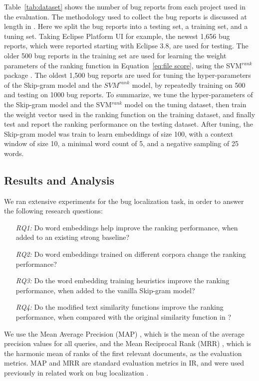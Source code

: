 Table~\ref{tab:dataset} shows the number of bug reports from each project used in the evaluation. The methodology used to collect the bug reports is discussed at length in \cite{ye:fse14}. Here we split the bug reports into a testing set, a training set, and a tuning set. Taking Eclipse Platform UI for example, the newest 1,656 bug reports, which were reported starting with Eclipse 3.8, are used for testing. The older 500 bug reports in the training set are used for learning the weight parameters of the ranking function in Equation~\ref{eq:file score}, using the SVM$^{rank}$ package \cite{Joachims:2002:OSE:775047.775067, Joachims:2006:TLS:1150402.1150429}. The oldest 1,500 bug reports are used for tuning the hyper-parameters of the Skip-gram model and the $SVM^{rank}$ model, by repeatedly training on 500 and testing on 1000 bug reports. To summarize, we tune the hyper-parameters of the Skip-gram model and the SVM$^{rank}$ model on the tuning dataset, then train the weight vector used in the ranking function on the training dataset, and finally test and report the ranking performance on the testing dataset. After tuning, the Skip-gram model was train to learn embeddings of size 100, with a context window of size 10, a minimal word count of 5, and a negative sampling of 25 words. 


\subsection{Results and Analysis}
\label{sec:evaluation:results and analysis}

We ran extensive experiments for the bug localization task, in order to answer the following research questions:
\begin{enumerate}
  \item[\textit{RQ1:}] Do word embeddings help improve the ranking performance, when added to an existing strong baseline?
  \item[\textit{RQ2:}] Do word embeddings trained on different corpora change the ranking performance?
  \item[\textit{RQ3:}] Do the word embedding training heuristics improve the ranking performance, when added to the vanilla Skip-gram model?
  \item[\textit{RQ4:}] Do the modified text similarity functions improve the ranking performance, when compared with the original similarity function in \cite{mihalcea:aaai06}?
\end{enumerate}

We use the Mean Average Precision (MAP) \cite{Manning:2008:IIR:1394399}, which is the mean of the average precision values for all queries, and the Mean Reciprocal Rank (MRR) \cite{Voorhees99thetrec-8}, which is the harmonic mean of ranks of the first relevant documents, as the evaluation metrics. MAP and MRR are standard evaluation metrics in IR, and were used previously in related work on bug localization \cite{Saha:2013:ASE:6693093, ye:fse14,Zhou:2012:BFM:2337223.2337226}.


